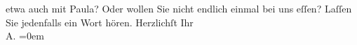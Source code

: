 \begin{ledgroupsized}[t]{13cm}
               etwa auch mit Paula? Oder wollen Sie nicht
               endlich einmal bei uns eſſen?\pend
           \pstart
           Laſſen Sie jedenfalls ein Wort hören.\pend
           \pstart
           Herzlichſt Ihr{\\[\baselineskip]}\spacefill\mbox{A.}\pend
           \leftskip=0em{}          \endnumbering{}\end{ledgroupsized}  \newcommand{\dateiname}{L01502}\newcommand{\titel}{Arthur Schnitzler an Richard Beer-Hofmann, 26. 2. 1905}\newcommand{\editorInnen}{Martin Anton Müller und Gerd-Hermann Susen}
            \footnotesize
\begin{ledgroupsized}[t]{11.5cm}
\end{ledgroupsized}
         
      